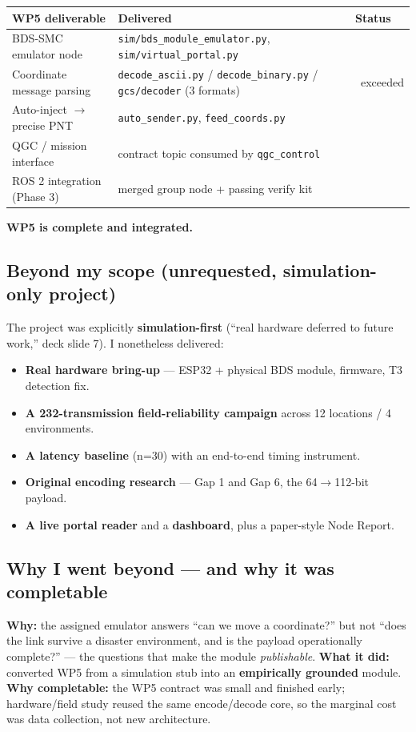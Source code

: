 \documentclass[11pt,a4paper]{article}
\newcommand{\yes}{\textcolor{good}{\ding{51}}}
\begin{document}
\begin{longtable}{@{}p{5.2cm} p{6.4cm} p{2.0cm}@{}}
\toprule
\textbf{WP5 deliverable} & \textbf{Delivered} & \textbf{Status} \\
\midrule
\endhead
BDS-SMC emulator node & \texttt{sim/bds\_module\_emulator.py}, \texttt{sim/virtual\_portal.py} & \yes \\
Coordinate message parsing & \texttt{decode\_ascii.py} / \texttt{decode\_binary.py} / \texttt{gcs/decoder} (3 formats) & \yes\ exceeded \\
Auto-inject $\to$ precise PNT & \texttt{auto\_sender.py}, \texttt{feed\_coords.py} & \yes \\
QGC / mission interface & contract topic consumed by \texttt{qgc\_control} & \yes \\
ROS 2 integration (Phase 3) & merged group node + passing verify kit & \yes \\
\bottomrule
\end{longtable}
\textbf{WP5 is complete and integrated.}

\subsection{Beyond my scope (unrequested, simulation-only project)}
The project was explicitly \textbf{simulation-first} (``real hardware deferred to future
work,'' deck slide 7). I nonetheless delivered:
\begin{itemize}[leftmargin=1.4em,itemsep=1pt]
  \item \textbf{Real hardware bring-up} --- ESP32 + physical BDS module, firmware, T3 detection fix.
  \item \textbf{A 232-transmission field-reliability campaign} across 12 locations / 4 environments.
  \item \textbf{A latency baseline} (n=30) with an end-to-end timing instrument.
  \item \textbf{Original encoding research} --- Gap 1 and Gap 6, the 64$\to$112-bit payload.
  \item \textbf{A live portal reader} and a \textbf{dashboard}, plus a paper-style Node Report.
\end{itemize}

\subsection{Why I went beyond --- and why it was completable}
\textbf{Why:} the assigned emulator answers ``can we move a coordinate?'' but not ``does the
link survive a disaster environment, and is the payload operationally complete?'' ---
the questions that make the module \emph{publishable}. \textbf{What it did:} converted WP5
from a simulation stub into an \textbf{empirically grounded} module. \textbf{Why
completable:} the WP5 contract was small and finished early; hardware/field study reused the
same encode/decode core, so the marginal cost was data collection, not new architecture.
\end{document}
